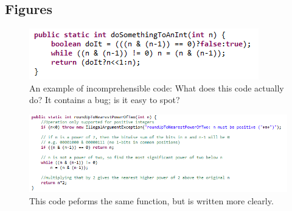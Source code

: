 \documentclass{bmcart}
\begin{document}
\begin{backmatter}




\section*{Figures}

\begin{figure}[h!]%
\includegraphics[width=\columnwidth]{code-snippet.png}%
\caption{An example of incomprehensible code: What does this code actually do? It contains a bug; is it easy to spot?}%
\label{fig-incomprehensible}%
\end{figure}

\begin{figure}[h!]%
\includegraphics[width=\columnwidth]{code-snippet-fixed.png}%
\caption{This code peforms the same function, but is written more clearly.}%
\label{fig-comprehensible}%
\end{figure}


\end{backmatter}
\end{document}
